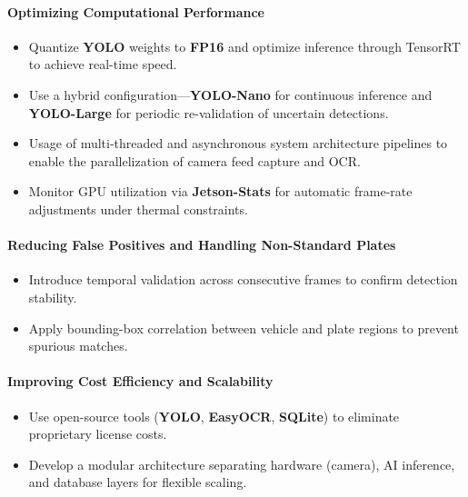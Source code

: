 \paragraph{Optimizing Computational Performance}
\begin{itemize}
	\item Quantize \textbf{YOLO} weights to \textbf{FP16} and optimize inference through TensorRT to achieve real-time speed.
	\item Use a hybrid configuration—\textbf{YOLO-Nano} for continuous inference and \textbf{YOLO-Large} for periodic re-validation of uncertain detections.
	\item Usage of multi-threaded and asynchronous system architecture pipelines to enable the parallelization of camera feed capture and \ac{OCR}.
	\item Monitor \ac{GPU} utilization via \textbf{Jetson-Stats} for automatic frame-rate adjustments under thermal constraints.
\end{itemize}

\paragraph{Reducing False Positives and Handling Non-Standard Plates}
\begin{itemize}
	\item Introduce temporal validation across consecutive frames to confirm detection stability.
	\item Apply bounding-box correlation between vehicle and plate regions to prevent spurious matches.
\end{itemize}

\paragraph{Improving Cost Efficiency and Scalability}
\begin{itemize}
	\item Use open-source tools (\textbf{YOLO}, \textbf{EasyOCR}, \textbf{SQLite}) to eliminate proprietary license costs.
	\item Develop a modular architecture separating hardware (camera), \ac{AI} inference, and database layers for flexible scaling.
\end{itemize}

